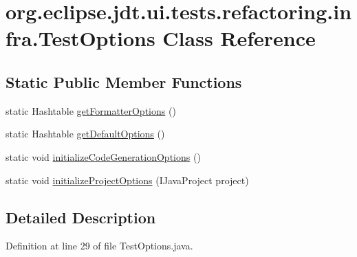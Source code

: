 \hypertarget{classorg_1_1eclipse_1_1jdt_1_1ui_1_1tests_1_1refactoring_1_1infra_1_1TestOptions}{
\section{org.eclipse.jdt.ui.tests.refactoring.infra.TestOptions Class Reference}
\label{classorg_1_1eclipse_1_1jdt_1_1ui_1_1tests_1_1refactoring_1_1infra_1_1TestOptions}
}
\subsection*{Static Public Member Functions}
\begin{DoxyCompactItemize}
\item 
static Hashtable \hyperlink{classorg_1_1eclipse_1_1jdt_1_1ui_1_1tests_1_1refactoring_1_1infra_1_1TestOptions_ac968e611dae61752d75fa66e1bbff8bd}{getFormatterOptions} ()
\item 
static Hashtable \hyperlink{classorg_1_1eclipse_1_1jdt_1_1ui_1_1tests_1_1refactoring_1_1infra_1_1TestOptions_ae11a9e17e58caab68c9231becda73f49}{getDefaultOptions} ()
\item 
static void \hyperlink{classorg_1_1eclipse_1_1jdt_1_1ui_1_1tests_1_1refactoring_1_1infra_1_1TestOptions_a0256c29a6b1f75355ed09e0bc5e764c4}{initializeCodeGenerationOptions} ()
\item 
static void \hyperlink{classorg_1_1eclipse_1_1jdt_1_1ui_1_1tests_1_1refactoring_1_1infra_1_1TestOptions_ab47a3545268b9078ffa1b7fe7151918e}{initializeProjectOptions} (IJavaProject project)
\end{DoxyCompactItemize}


\subsection{Detailed Description}


Definition at line 29 of file TestOptions.java.



